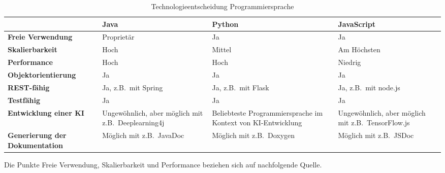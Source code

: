 \begin{table}[H]
    \begin{tabularx}{\textwidth}{l|X|X|X}
        ~                                      & \textbf{Java}                                                            & \textbf{Python}                                                                  & \textbf{JavaScript}                                                     \\ \hline
        \textbf{Freie Verwendung}              & \cellcolor{red!30} Proprietär                                            & \cellcolor{green!30}Ja                                                           & \cellcolor{green!30}Ja                                                  \\ \hline
        \textbf{Skalierbarkeit}                & \cellcolor{green!30}Hoch                                                 & \cellcolor{orange!30}Mittel                                                      & \cellcolor{green!30}Am Höchsten                                         \\ \hline
        \textbf{Performance}                   & \cellcolor{green!30}Hoch                                                 & \cellcolor{green!30}Hoch                                                         & \cellcolor{red!30}Niedrig                                               \\ \hline
        \textbf{Objektorientierung}            & \cellcolor{green!30}Ja                                                   & \cellcolor{green!30}Ja                                                           & \cellcolor{green!30}Ja                                                  \\ \hline
        \textbf{REST-fähig}                    & \cellcolor{green!30}Ja, z.B.\ mit Spring                                 & \cellcolor{green!30}Ja, z.B.\ mit Flask & \cellcolor{green!30}Ja, z.B.\ mit node.js \\ \hline
        \textbf{Testfähig}                     & \cellcolor{green!30}Ja                                                   & \cellcolor{green!30}Ja                                                           & \cellcolor{green!30}Ja                                                  \\ \hline
        \textbf{Entwicklung einer KI}          & \cellcolor{orange!30}Ungewöhnlich, aber möglich mit z.B.\ Deeplearning4j & \cellcolor{green!30}Beliebteste Programmiersprache im Kontext von KI-Entwicklung & \cellcolor{orange!30}Ungewöhnlich, aber möglich mit z.B.\ TensorFlow.js \\ \hline
        \textbf{Generierung der Dokumentation} & \cellcolor{green!30}Möglich mit z.B.\ JavaDoc & \cellcolor{green!30}Möglich mit z.B.\ Doxygen & \cellcolor{green!30}Möglich mit z.B.\ JSDoc \\
    \end{tabularx}
    \caption{Technologieentscheidung Programmiersprache}
    \label{tab:technologieentscheidung-programmiersprache}
\end{table}
Die Punkte Freie Verwendung, Skalierbarkeit und Performance beziehen sich auf nachfolgende Quelle\autocite{nodejavapython}.


